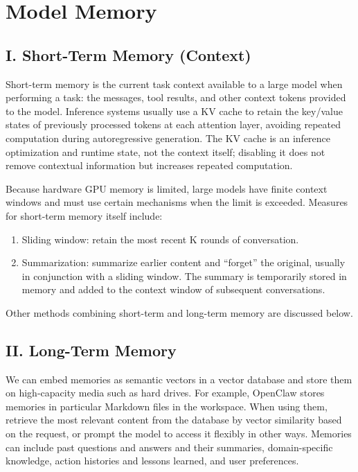 \setcounter{section}{1}

\hypertarget{model-memory}{%
\section{Model Memory}\label{model-memory}}

\hypertarget{i.-short-term-memory-context}{%
\subsection{I. Short-Term Memory (Context)}\label{i.-short-term-memory-context}}

Short-term memory is the current task context available to a large model when performing a task: the messages, tool results, and other context tokens provided to the model. Inference systems usually use a KV cache to retain the key/value states of previously processed tokens at each attention layer, avoiding repeated computation during autoregressive generation. The KV cache is an inference optimization and runtime state, not the context itself; disabling it does not remove contextual information but increases repeated computation.

Because hardware GPU memory is limited, large models have finite context windows and must use certain mechanisms when the limit is exceeded. Measures for short-term memory itself include:

\begin{enumerate}
\def\labelenumi{\arabic{enumi}.}
\item
  Sliding window: retain the most recent K rounds of conversation.
\item
  Summarization: summarize earlier content and ``forget'' the original, usually in conjunction with a sliding window. The summary is temporarily stored in memory and added to the context window of subsequent conversations.
\end{enumerate}

Other methods combining short-term and long-term memory are discussed below.

\hypertarget{ii.-long-term-memory}{%
\subsection{II. Long-Term Memory}\label{ii.-long-term-memory}}

We can embed memories as semantic vectors in a vector database and store them on high-capacity media such as hard drives. For example, OpenClaw stores memories in particular Markdown files in the workspace. When using them, retrieve the most relevant content from the database by vector similarity based on the request, or prompt the model to access it flexibly in other ways. Memories can include past questions and answers and their summaries, domain-specific knowledge, action histories and lessons learned, and user preferences.

